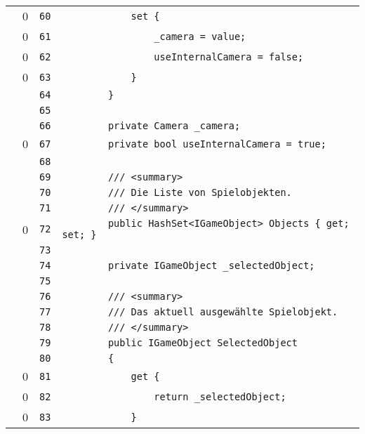 \documentclass[a4paper,10pt]{article}
\begin{document}
\begin{longtable}[l]{lrrl}
\cellcolor{red} & 0 & \verb~60~ & \verb~            set {~\\
\cellcolor{red} & 0 & \verb~61~ & \verb~                _camera = value;~\\
\cellcolor{red} & 0 & \verb~62~ & \verb~                useInternalCamera = false;~\\
\cellcolor{red} & 0 & \verb~63~ & \verb~            }~\\
\cellcolor{gray} &  & \verb~64~ & \verb~        }~\\
\cellcolor{gray} &  & \verb~65~ & \verb~~\\
\cellcolor{gray} &  & \verb~66~ & \verb~        private Camera _camera;~\\
\cellcolor{red} & 0 & \verb~67~ & \verb~        private bool useInternalCamera = true;~\\
\cellcolor{gray} &  & \verb~68~ & \verb~~\\
\cellcolor{gray} &  & \verb~69~ & \verb~        /// <summary>~\\
\cellcolor{gray} &  & \verb~70~ & \verb~        /// Die Liste von Spielobjekten.~\\
\cellcolor{gray} &  & \verb~71~ & \verb~        /// </summary>~\\
\cellcolor{red} & 0 & \verb~72~ & \verb~        public HashSet<IGameObject> Objects { get; set; }~\\
\cellcolor{gray} &  & \verb~73~ & \verb~~\\
\cellcolor{gray} &  & \verb~74~ & \verb~        private IGameObject _selectedObject;~\\
\cellcolor{gray} &  & \verb~75~ & \verb~~\\
\cellcolor{gray} &  & \verb~76~ & \verb~        /// <summary>~\\
\cellcolor{gray} &  & \verb~77~ & \verb~        /// Das aktuell ausgewählte Spielobjekt.~\\
\cellcolor{gray} &  & \verb~78~ & \verb~        /// </summary>~\\
\cellcolor{gray} &  & \verb~79~ & \verb~        public IGameObject SelectedObject~\\
\cellcolor{gray} &  & \verb~80~ & \verb~        {~\\
\cellcolor{red} & 0 & \verb~81~ & \verb~            get {~\\
\cellcolor{red} & 0 & \verb~82~ & \verb~                return _selectedObject;~\\
\cellcolor{red} & 0 & \verb~83~ & \verb~            }~\\

\end{longtable}
\end{document}
